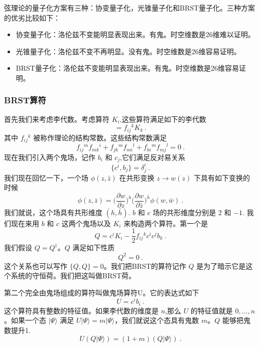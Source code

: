
弦理论的量子化方案有三种：协变量子化，光锥量子化和BRST量子化。三种方案的优劣比较如下：
\begin{itemize}
\item 协变量子化：洛伦兹不变能明显表现出来。有鬼。时空维数是26维难以证明。
\item 光锥量子化：洛伦兹不变不再明显。没有鬼。时空维数是26维容易证明。
\item BRST量子化：洛伦兹不变能明显表现出来。有鬼。时空维数是26维容易证明。
\end{itemize}
\subsubsection{BRST算符}
首先我们来考虑李代数。考虑算符 $K_i$,这些算符满足如下的李代数
\begin{equation}
[K_i,K_j] = f_{ij}{}^k K_k~.
\end{equation}
其中 $f_{ij}{}^k$ 被称作理论的结构常数。这些结构常数满足
\begin{equation}
f_{ij}{}^m f_{mk}{}^i + f_{jk}{}^m f_{mi}{}^l+f_{ki}{}^m f_{mj}{}^l = 0 ~. 
\end{equation}
现在我们引入两个鬼场，记作 $b_i$ 和 $c_j$,它们满足反对易关系
\begin{equation}\label{BRST_eq5}
\{ c^i, b_j \} = \delta^i_j~.
\end{equation}
我们现在回忆一下，一个场 $\phi(z,\bar z)$ 在共形变换 $z\rightarrow w(z)$ 下具有如下变换的时候
\begin{equation}
\phi(z,\bar z) = \bigg( \frac{\partial w}{\partial z} \bigg)^h \bigg( \frac{\partial w}{\partial \bar z} \bigg)^{\bar h} \phi (w,\bar w)~.
\end{equation}
我们就说，这个场具有共形维度 $(h,\bar h)$. $b$ 和 $c$ 场的共形维度分别是 $2$ 和 $-1$. 我们现在来用 $b$ 和 $c$ 这两个鬼场以及 $K_i$ 来构造两个算符。第一个是
\begin{equation}
Q = c^i K_i - \frac{1}{2} f_{ij}{}^k c^i c^j b_k~.
\end{equation}
我们假设 $Q = Q^\dagger$。$Q$ 满足如下性质
\begin{equation}
Q^2 = 0~.
\end{equation}
这个关系也可以写作 $\{Q,Q\}=0$。我们把BRST的算符记作 $Q$ 是为了暗示它是这个系统的守恒荷。我们把这叫做BRST荷。

第二个完全由鬼场组成的算符叫做鬼场算符U。它的表达式如下
\begin{equation}\label{BRST_eq1}
U = c^i b_i~.
\end{equation}
这个算符具有整数的特征值。如果李代数的维度是 $n$,那么 $U$ 的特征值就是 $0,\ldots ,n$。如果一个态 $|\Psi\rangle$ 满足 $U|\Psi\rangle=m|\Psi\rangle$，我们就说这个态具有鬼数 $m$。$Q$ 能够把鬼数提升1.
\begin{equation}
U (Q|\Psi\rangle) = (1+m) (Q|\Psi\rangle)~. 
\end{equation}
